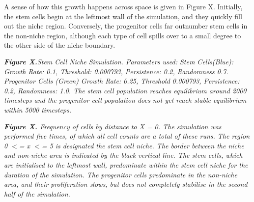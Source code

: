 \documentclass[11.5pt]{article}
\begin{document}
A sense of how this growth happens across space is given in Figure X. 
Initially, the stem cells begin at the leftmost wall of the simulation, 
and they quickly fill out the niche region. Conversely, the progenitor 
cells far outnumber stem cells in the non-niche region, although each 
type of cell spills over to a small degree to the other side of the 
niche boundary.

\begin{figure}[H]
\centering
\end{figure}

{\bfseries {\itshape Figure X.}}{\itshape  Stem Cell Niche Simulation. 
Parameters used: Stem Cells(Blue): Growth Rate: 0.1, Threshold: 
0.000793, Persistence: 0.2, Randomness 0.7. Progenitor Cells (Green) 
Growth Rate: 0.25, Threshold 0.000793, Persistence: 0.2, Randomness: 
1.0. The stem cell population reaches equilibrium around 2000 timesteps 
and the progenitor cell population does not yet reach stable equilibrium 
within 5000 timesteps.}

{\begin{figure}[H]
\centering
\end{figure}
\begin{figure}[H]
\centering
\end{figure}
}

{\begin{figure}[H]
\centering
\end{figure}
\begin{figure}[H]
\centering
\end{figure}
}

{\begin{figure}[H]
\centering
\end{figure}
\begin{figure}[H]
\centering
\end{figure}
}

{\bfseries {\itshape Figure X. }}{\itshape Frequency of cells by distance 
to X = 0. The simulation was performed five times, of which all cell 
counts are a total of these runs. The region 0 $<$= x $<$= 5 is 
designated the stem cell niche. The border between the niche and 
non-niche area is indicated by the black vertical line. The stem cells, 
which are initialised to the leftmost wall, predominate within the stem 
cell niche for the duration of the simulation. The progenitor cells 
predominate in the non-niche area, and their proliferation slows, but 
does not completely stabilise in the second half of the simulation.}
\end{document}
